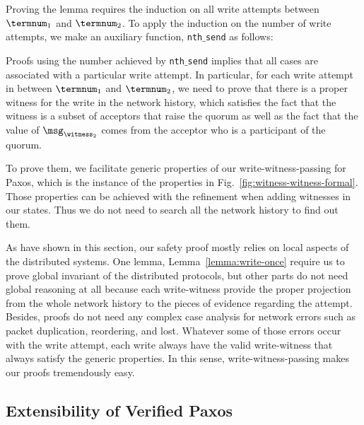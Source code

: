 Proving the lemma requires the induction on all write attempts between $\termnum_1$ and $\termnum_2$. 
To apply the induction on the number of write attempts, we make an auxiliary function, \texttt{nth$\_$send} as follows:



Proofs using the number achieved by  \texttt{nth$\_$send} implies that all cases are associated with a particular write attempt. 
In particular, 
for each write attempt in between $\termnum_1$ and $\termnum_2$,
we need to prove that 
there is a proper witness for the write in the network history, 
which satisfies the fact that the witness is  a subset of acceptors that raise the quorum
as well as the fact that the value of $\msg_{\witness_2}$ comes from the acceptor who is a participant of the quorum. 

To prove them, we facilitate generic properties of our write-witness-passing for Paxos,
which is the instance of the properties in Fig.~\ref{fig:witness-witness-formal}.
Those properties can be achieved with the refinement when adding witnesses in our states. Thus we do not need to search all the network history to find out them. 

As have shown in this section, 
our safety proof mostly relies on local aspects of the distributed systems. 
One lemma, Lemma~\ref{lemma:write-once} require us to 
prove global invariant of the distributed protocols, 
but other parts do not need  global reasoning at all because 
each write-witness provide the proper projection from the whole network history to the pieces of evidence regarding 
the attempt. 
Besides, 
proofs do not need any complex case analysis 
for network errors such as packet duplication, reordering, and lost.
Whatever some of those errors occur with the write attempt, 
each write always have the valid write-witness that always satisfy the generic properties. 
In this sense, write-witness-passing makes our proofs tremendously easy.  


\subsection{Extensibility of Verified Paxos}
\label{subsec:extensibility-of-verified-paxos}

